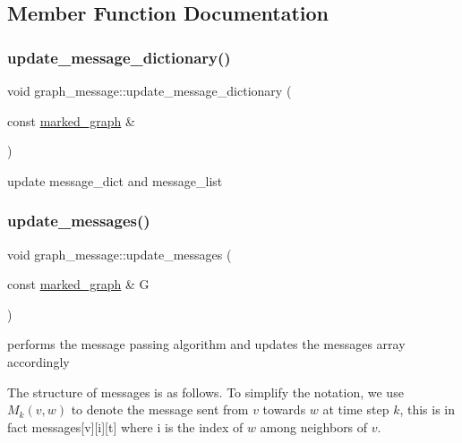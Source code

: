 \subsection{Member Function Documentation}
\mbox{\label{classgraph__message_a77d137b371134e292283fdd78634f4d4}} 
\subsubsection{\texorpdfstring{update\+\_\+message\+\_\+dictionary()}{update\_message\_dictionary()}}
{\footnotesize\ttfamily void graph\+\_\+message\+::update\+\_\+message\+\_\+dictionary (\begin{DoxyParamCaption}\item[{const \hyperlink{classmarked__graph}{marked\+\_\+graph} \&}]{ }\end{DoxyParamCaption})\hspace{0.3cm}{\ttfamily [private]}}



update message\+\_\+dict and message\+\_\+list 

\mbox{\label{classgraph__message_a40dadc59d582b290202e79bc4a9e896c}} 
\subsubsection{\texorpdfstring{update\+\_\+messages()}{update\_messages()}}
{\footnotesize\ttfamily void graph\+\_\+message\+::update\+\_\+messages (\begin{DoxyParamCaption}\item[{const \hyperlink{classmarked__graph}{marked\+\_\+graph} \&}]{G }\end{DoxyParamCaption})\hspace{0.3cm}{\ttfamily [private]}}



performs the message passing algorithm and updates the messages array accordingly 

The structure of messages is as follows. To simplify the notation, we use $M_k(v,w)$ to denote the message sent from $v$ towards $w$ at time step $k$, this is in fact messages\mbox{[}v\mbox{]}\mbox{[}i\mbox{]}\mbox{[}t\mbox{]} where i is the index of $w$ among neighbors of $v$.


